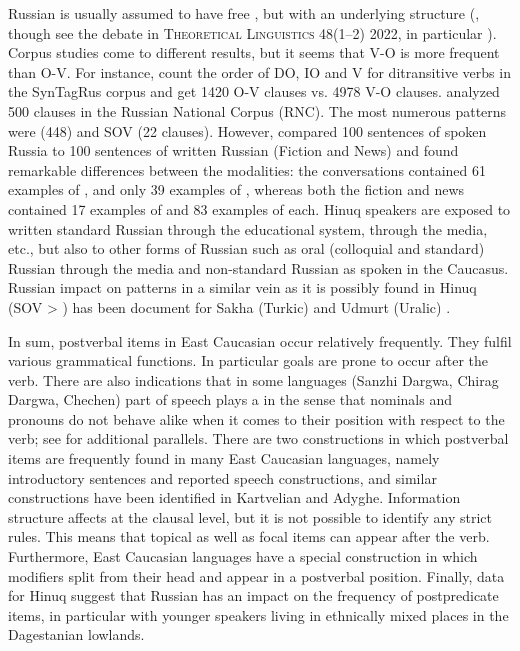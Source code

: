 \documentclass[output=paper,colorlinks,citecolor=brown,draftmode]{langscibook}
\begin{document}
Russian is usually assumed to have free , but with an underlying  structure (\citealt{tomlin_basic_1986}, though see the debate in \textsc{Theoretical Linguistics} 48(1--2) 2022, in particular \citet{haider_slavic_2022}). Corpus studies come to different results, but it seems that V-O is more frequent than O-V. For instance, \citet{bazhukov_order_2021} count the order of DO, IO and V for ditransitive verbs in the SynTagRus corpus and get 1420 O-V clauses vs. 4978 V-O clauses. \citet{billings2015corpus} analyzed 500 clauses in the Russian National Corpus (RNC). The most numerous patterns were  (448) and SOV (22 clauses). However, \citet[856--857]{levshina_why_2023} compared 100 sentences of spoken Russia to 100 sentences of written Russian (Fiction and News) and found remarkable differences between the modalities: the conversations contained 61 examples of , and only 39 examples of , whereas both the fiction and news contained 17 examples of  and 83 examples of  each. Hinuq speakers are exposed to written standard Russian through the educational system, through the media, etc., but also to other forms of Russian such as oral (colloquial and standard) Russian through the media and non-standard Russian as spoken in the Caucasus. Russian impact on  patterns in a similar vein as it is possibly found in Hinuq (SOV > ) has been document for Sakha (Turkic) \citep{grenoble_evidence_2019} and Udmurt (Uralic) \citep{asztalos_head-final_2021}.

In sum, postverbal items in East Caucasian occur relatively frequently. They fulfil various grammatical functions. In particular goals are prone to occur after the verb. There are also indications that in some languages (Sanzhi Dargwa, Chirag Dargwa, Chechen) part of speech plays a  in the sense that nominals and pronouns do not behave alike when it comes to their position with respect to the verb; see  for additional parallels. There are two constructions in which postverbal items are frequently found in many East Caucasian languages, namely  introductory sentences and reported speech constructions, and similar constructions have been identified in Kartvelian and Adyghe. Information structure affects  at the clausal level, but it is not possible to identify any strict rules. This means that topical as well as focal items can appear after the verb. Furthermore, East Caucasian languages have a special construction in which modifiers split from their head and appear in a postverbal position. Finally, data for Hinuq suggest that Russian has an impact on the frequency of postpredicate items, in particular with younger speakers living in ethnically mixed places in the Dagestanian lowlands.
\end{document}
